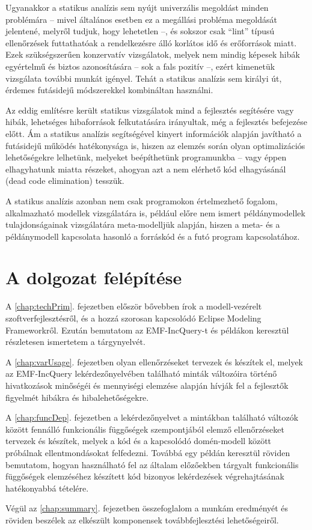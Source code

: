 Ugyanakkor a statikus analízis sem nyújt univerzális megoldást minden problémára -- mivel általános esetben ez a megállási probléma megoldását jelentené, melyről tudjuk, hogy lehetetlen --, és sokszor csak ``lint'' típusú ellenőrzések futtathatóak a rendelkezésre álló korlátos idő és erőforrások miatt.
Ezek szükségszerűen konzervatív vizsgálatok, melyek nem mindig képesek hibák egyértelmű és biztos azonosítására -- sok a fals pozitív --, ezért kimenetük vizsgálata további munkát igényel.
Tehát a statikus analízis sem királyi út, érdemes futásidejű módszerekkel kombináltan használni.

Az eddig említésre került statikus vizsgálatok mind a fejlesztés segítésére vagy hibák, lehetséges hibaforrások felkutatására irányultak, még a fejlesztés befejezése előtt.
Ám a statikus analízis segítségével kinyert információk alapján javítható a futásidejű működés hatékonysága is, hiszen az elemzés során olyan optimalizációs lehetőségekre lelhetünk, melyeket beépíthetünk programunkba -- vagy éppen elhagyhatunk miatta részeket, ahogyan azt a nem elérhető kód elhagyásánál (dead code elimination) tesszük.

A statikus analízis azonban nem csak programokon értelmezhető fogalom, alkalmazható modellek vizsgálatára is, például előre nem ismert példánymodellek tulajdonságainak vizsgálatára meta-modelljük alapján, hiszen a meta- és a példánymodell kapcsolata hasonló a forráskód és a futó program kapcsolatához.

\section{A dolgozat felépítése}


A \ref{chap:techPrim}. fejezetben először bővebben írok a modell-vezérelt szoftverfejlesztésről, és a hozzá szorosan kapcsolódó Eclipse Modeling Frameworkről.
Ezután bemutatom az EMF-IncQuery-t és példákon keresztül részletesen ismertetem a tárgynyelvét.

A \ref{chap:varUsage}. fejezetben olyan ellenőrzéseket tervezek és készítek el, melyek az EMF-IncQuery lekérdezőnyelvében található minták változóira történő hivatkozások minőségéi és mennyiségi elemzése alapján hívják fel a fejlesztők figyelmét hibákra és hibalehetőségekre.

A \ref{chap:funcDep}. fejezetben a lekérdezőnyelvet a mintákban található változók között fennálló funkcionális függőségek szempontjából elemző ellenőrzéseket tervezek és készítek, melyek a kód és a kapcsolódó domén-modell között próbálnak ellentmondásokat felfedezni.
Továbbá egy példán keresztül röviden bemutatom, hogyan használható fel az általam előzőekben tárgyalt funkcionális függőségek elemzéséhez készített kód bizonyos lekérdezések végrehajtásának hatékonyabbá tételére.

Végül az \ref{chap:summary}. fejezetben összefoglalom a munkám eredményét és röviden beszélek az elkészült komponensek továbbfejlesztési lehetőségeiről.
